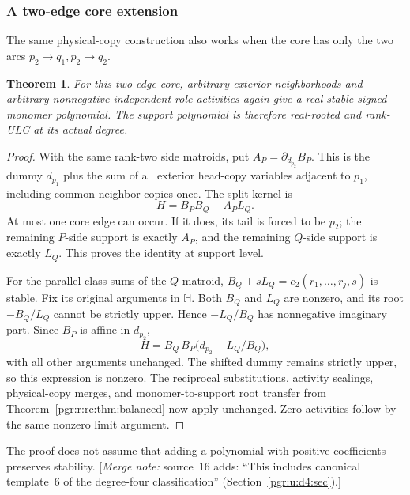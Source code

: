 \documentclass[11pt]{article}
\numberwithin{equation}{section}
\newtheorem{theorem}{Theorem}[section]\newtheorem{lemma}[theorem]{Lemma}\newtheorem{proposition}[theorem]{Proposition}\newtheorem{corollary}[theorem]{Corollary}
\theoremstyle{definition}\newtheorem{definition}[theorem]{Definition}\newtheorem{remark}[theorem]{Remark}
\newcommand{\HH}{\mathbb H}                %
\newcommand{\mnote}[1]{[\textit{Merge note:} #1]}
\begin{document}
\subsubsection{A two-edge core extension}
The same physical-copy construction also works when the core has only the two arcs $p_2\to q_1,p_2\to q_2$.
\begin{theorem}\label{pgr:r:rc:thm:twoedge}
For this two-edge core, arbitrary exterior neighborhoods and arbitrary nonnegative independent role activities again give a real-stable signed monomer polynomial. The support polynomial is therefore real-rooted and rank-ULC at its actual degree.
\end{theorem}
\begin{proof}
With the same rank-two side matroids, put $A_P=\partial_{d_{p_2}}B_P$. This is the dummy $d_{p_1}$ plus the sum of all exterior head-copy variables adjacent to $p_1$, including common-neighbor copies once. The split kernel is
\[
 H=B_PB_Q-A_PL_Q.
\]
At most one core edge can occur. If it does, its tail is forced to be $p_2$; the remaining $P$-side support is exactly $A_P$, and the remaining $Q$-side support is exactly $L_Q$. This proves the identity at support level.

For the parallel-class sums of the $Q$ matroid, $B_Q+sL_Q=e_2(r_1,\ldots,r_j,s)$ is stable. Fix its original arguments in $\HH$. Both $B_Q$ and $L_Q$ are nonzero, and its root $-B_Q/L_Q$ cannot be strictly upper. Hence $-L_Q/B_Q$ has nonnegative imaginary part. Since $B_P$ is affine in $d_{p_2}$,
\[
 H=B_Q\,B_P\bigl(d_{p_2}-L_Q/B_Q\bigr),
\]
with all other arguments unchanged. The shifted dummy remains strictly upper, so this expression is nonzero. The reciprocal substitutions, activity scalings, physical-copy merges, and monomer-to-support root transfer from Theorem~\ref{pgr:r:rc:thm:balanced} now apply unchanged. Zero activities follow by the same nonzero limit argument.
\end{proof}
The proof does not assume that adding a polynomial with positive coefficients preserves stability.
\mnote{source~16 adds: ``This includes canonical template~6 of the
degree-four classification'' (Section~\ref{pgr:u:d4:sec}).}
\end{document}
